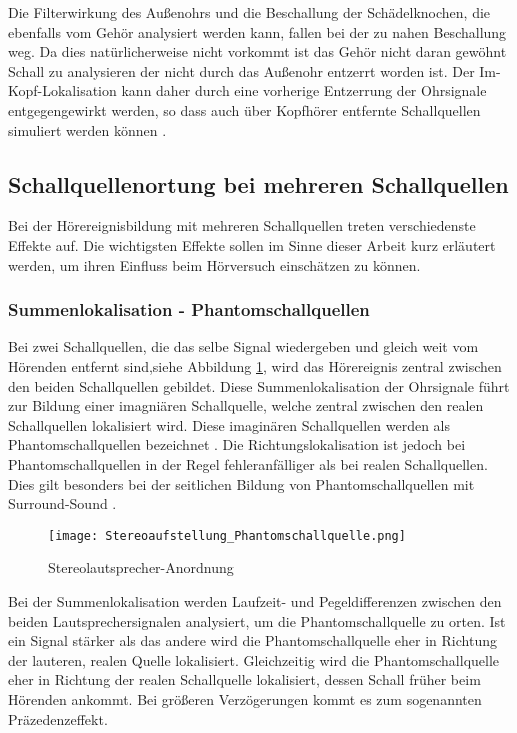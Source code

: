 Die Filterwirkung des Außenohrs und die Beschallung der Schädelknochen, die ebenfalls vom Gehör analysiert werden kann, fallen bei der zu nahen Beschallung weg. Da dies natürlicherweise nicht vorkommt ist das Gehör nicht daran gewöhnt Schall zu analysieren der nicht durch das Außenohr entzerrt worden ist. Der Im-Kopf-Lokalisation kann daher durch eine vorherige Entzerrung der Ohrsignale entgegengewirkt werden, so dass auch über Kopfhörer entfernte Schallquellen simuliert werden können \cite[S.47]{Blauert80}.

\subsection{Schallquellenortung bei mehreren Schallquellen}

Bei der Hörereignisbildung mit mehreren Schallquellen treten verschiedenste Effekte auf. Die wichtigsten Effekte sollen im Sinne dieser Arbeit kurz erläutert werden, um ihren Einfluss beim Hörversuch einschätzen zu können. 

\subsubsection{Summenlokalisation - Phantomschallquellen}

Bei zwei Schallquellen, die das selbe Signal wiedergeben und gleich weit vom Hörenden entfernt sind,siehe Abbildung \ref{fig:Stereoaufstellung_Phantomschallquelle}, wird das Hörereignis zentral zwischen den beiden Schallquellen gebildet. Diese Summenlokalisation der Ohrsignale führt zur Bildung einer imagniären Schallquelle, welche zentral zwischen den realen Schallquellen lokalisiert wird. Diese imaginären Schallquellen werden als Phantomschallquellen bezeichnet  \cite[S.101]{HdA08}.
Die Richtungslokalisation ist jedoch bei Phantomschallquellen in der Regel fehleranfälliger als bei realen Schallquellen. Dies gilt besonders bei der seitlichen Bildung von Phantomschallquellen mit Surround-Sound  \cite[S.103]{HdA08}. 

\begin{figure}[H]
\centering
\texttt{[image: Stereoaufstellung\_Phantomschallquelle.png]}
\caption{Stereolautsprecher-Anordnung} 
\label{fig:Stereoaufstellung_Phantomschallquelle}
\end{figure}

Bei der Summenlokalisation werden Laufzeit- und Pegeldifferenzen zwischen den beiden Lautsprechersignalen analysiert, um die Phantomschallquelle zu orten. Ist ein Signal stärker als das andere  wird die Phantomschallquelle eher in Richtung der lauteren, realen Quelle lokalisiert. Gleichzeitig wird die Phantomschallquelle eher in Richtung der realen Schallquelle lokalisiert, dessen Schall früher beim Hörenden ankommt. Bei größeren Verzögerungen kommt es zum sogenannten Präzedenzeffekt. \\ 

